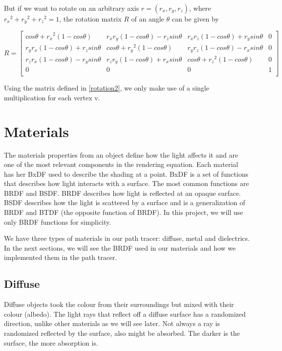 \documentclass[titlepage,12pt]{report}
\begin{document}
But if we want to rotate on an arbitrary axis $r = (r_x, r_y, r_z)$, where ${r_x}^2 + {r_y}^2 + {r_z}^2 = 1$, the rotation matrix $R$ of an angle $\theta$ can be given by

\begin{equation}\label{rotation2}
R = 
\begin{bmatrix}
cos\theta + {r_x}^2(1 - cos\theta) 	& {r_x}{r_y}(1 - cos\theta) - {r_z}sin\theta & {r_x}{r_z}(1 - cos\theta) + {r_y}sin\theta & 0 \\
{r_y}{r_x}(1 - cos\theta) + {r_z}sin\theta & cos\theta + {r_y}^2(1 - cos\theta) & {r_y}{r_z}(1 - cos\theta) - {r_x}sin\theta & 0\\

{r_z}{r_x}(1 - cos\theta) - {r_y}sin\theta & {r_z}{r_y}(1 - cos\theta) + {r_x}sin\theta & cos\theta + {r_z}^2 (1 - cos\theta) & 0\\
0 							& 0 & 0 & 1 \\
\end{bmatrix}
\end{equation}

Using the matrix defined in \ref{rotation2}, we only make use of a single multiplication for each vertex v.

\section{Materials}

The materials properties from an object define how the light affects it and are one of the most relevant components in the rendering equation. Each material has her BxDF used to describe the shading at a point. BxDF is a set of functions that describes how light interacts with a surface. The most common functions are BRDF and BSDF. BRDF describes how light is reflected at an opaque surface. BSDF describes how the light is scattered by a surface and is a generalization of BRDF and BTDF (the opposite function of BRDF). In this project, we will use only BRDF functions for simplicity.

We have three types of materials in our path tracer: diffuse, metal and dielectrics. In the next sections, we will see the BRDF used in our materials and how we implemented them in the path tracer.

\subsection{Diffuse}

Diffuse objects took the colour from their surroundings but mixed with their colour (albedo). The light rays that reflect off a diffuse surface has a randomized direction, unlike other materials as we will see later. Not always a ray is randomized reflected by the surface, also might be absorbed. The darker is the surface, the more absorption is.
\end{document}
